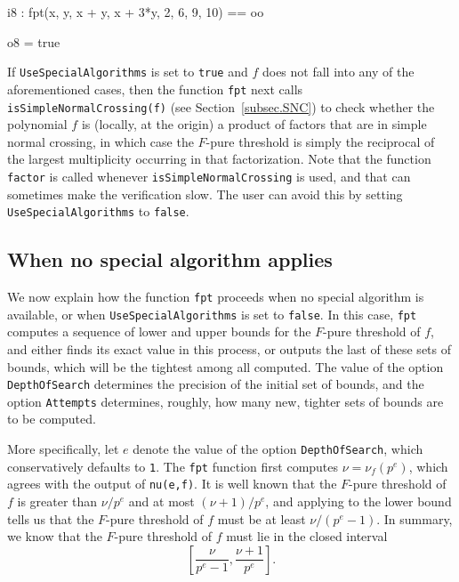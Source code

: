 \documentclass{amsart}
\begin{document}
\smallskip
{\small
{}
\begin{MyVerbatim}
i8 : fpt({x, y, x + y, x + 3*y}, {2, 6, 9, 10}) == oo

o8 = true
\end{MyVerbatim}
}
\smallskip

If \texttt{UseSpecialAlgorithms} is set to \texttt{true} and $f$ does not fall into any of the aforementioned cases, then the function \texttt{fpt} next calls \texttt{isSimpleNormalCrossing(f)} (see Section~\ref{subsec.SNC}) to check whether the polynomial $f$ is (locally, at the origin) a product of factors that are in simple normal crossing, in which case the $F$-pure threshold is simply the reciprocal of the largest multiplicity occurring in that factorization.  
Note that the function \texttt{factor} is called whenever \texttt{isSimpleNormalCrossing} is used, and that can sometimes make the verification slow.  The user can avoid this by setting \texttt{UseSpecialAlgorithms} to \texttt{false}.

\subsection{When no special algorithm applies}

We now explain how the function  \texttt{fpt} proceeds when no special algorithm is available, or when \texttt{UseSpecialAlgorithms} is set to \texttt{false}.
In this case, \texttt{fpt} computes a sequence of lower and upper bounds for the $F$-pure threshold of $f$, and either finds its exact value in this process, or outputs the last of these sets of bounds, which will be the tightest among all computed.
The value of the option \texttt{DepthOfSearch} determines the precision of the initial set of bounds, and the option \texttt{Attempts} determines, roughly, how many new, tighter sets of bounds are to be computed.

More specifically, let $e$ denote the value of the option \texttt{DepthOfSearch}, which conservatively defaults to \texttt{1}.
The \texttt{fpt} function first computes $\nu=\nu_f(p^e)$, which agrees with the output of \texttt{nu(e,f)}.
It is well known that the $F$-pure threshold of $f$ is greater than $\nu/p^e$ and at most $(\nu+1)/p^e$, and applying  \cite[Proposition~4.2]{HernandezFPurityOfHypersurfaces} to the lower bound tells us that the $F$-pure threshold of $f$ must be at least $\nu/(p^e-1)$.
In summary, we know that the $F$-pure threshold of $f$ must lie in the closed interval
%
\begin{equation}
\label{estimating-interval: e}
\tag{$\dagger$}
\left[ \frac{\nu}{p^e-1}, \frac{\nu+1}{p^e} \right].
\end{equation}
\end{document}
